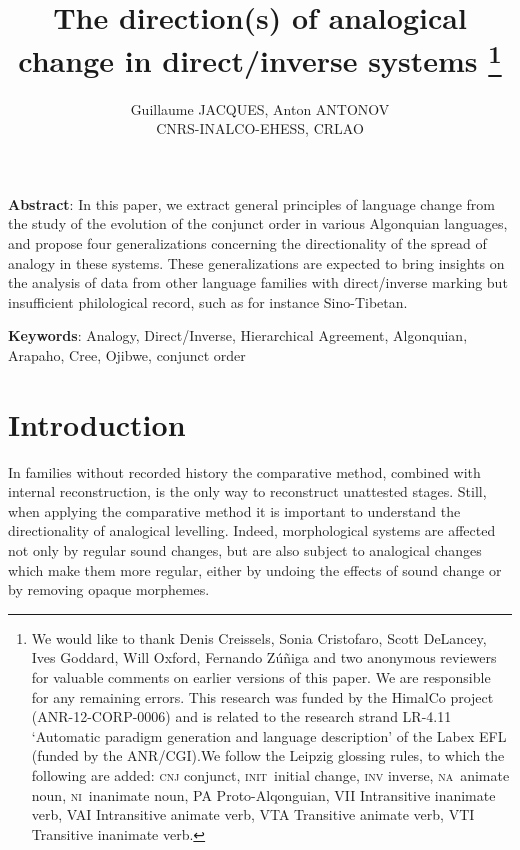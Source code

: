 \documentclass[twoside,a4paper,11pt]{article}
\newcommand{\Σ}{\greek{Σ}}
\newcommand{\init}{\textsc{init}}
\newcommand{\nanim}{\textsc{na}}
\newcommand{\ninan}{\textsc{ni}}
\begin{document}
\linenumbers
\title{The direction(s) of analogical change in direct/inverse systems \footnote{We would like to thank Denis Creissels, Sonia Cristofaro, Scott DeLancey, Ives Goddard, Will Oxford, Fernando Zúñiga and two anonymous reviewers for valuable comments on earlier versions of this paper. We are responsible for any remaining errors. This research was funded by the HimalCo project (ANR-12-CORP-0006) and is related to the research strand LR-4.11 `Automatic paradigm generation and language description' of the Labex EFL (funded by the ANR/CGI).We follow the Leipzig glossing rules, to which the following are added: \textsc{cnj} conjunct, \init\ initial change, \textsc{inv} inverse, \nanim\ animate noun, \ninan\ inanimate noun, PA Proto-Alqonguian, VII Intransitive inanimate verb, VAI Intransitive animate verb, VTA Transitive animate verb, VTI Transitive inanimate verb.  } }

\author{Guillaume JACQUES, Anton ANTONOV\\ CNRS-INALCO-EHESS, CRLAO}
\maketitle

\textbf{Abstract}: In this paper, we extract general principles of language change from the study of the evolution of the conjunct order in various Algonquian languages, and propose four generalizations concerning the directionality of the spread of analogy in these systems. These generalizations are expected to bring insights on the analysis of data from other language families with direct/inverse marking but insufficient philological record, such as for instance Sino-Tibetan.

\textbf{Keywords}: Analogy, Direct/Inverse, Hierarchical Agreement, Algonquian, Arapaho, Cree, Ojibwe, conjunct order

 
\section{Introduction}
In families without recorded history the comparative method, combined with internal reconstruction, is the only way to reconstruct unattested stages. Still, when applying the comparative method it is important to understand the directionality of analogical levelling.  Indeed, morphological systems are affected not only by regular sound changes, but are also subject to analogical changes which make them more regular, either by undoing the effects of sound change or by removing opaque morphemes.
\end{document}
